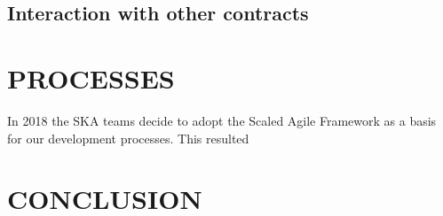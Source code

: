 \documentclass[a4paper,
               biblatex,     %
               keeplastbox,   %
               ]{jacow}
\begin{document}
\subsection{Interaction with other contracts}



\section{PROCESSES}
In 2018 the SKA teams decide to adopt the Scaled Agile Framework as a basis for our development processes. This resulted 




\section{CONCLUSION}
\end{document}
